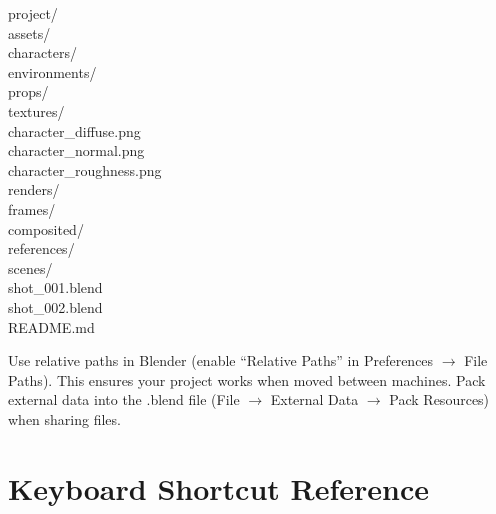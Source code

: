 \documentclass[11pt,letterpaper,twoside,openright]{book}
\begin{document}
\begin{codebox}
project/\\
\hspace{2em}assets/\\
\hspace{4em}characters/\\
\hspace{4em}environments/\\
\hspace{4em}props/\\
\hspace{2em}textures/\\
\hspace{4em}character\_diffuse.png\\
\hspace{4em}character\_normal.png\\
\hspace{4em}character\_roughness.png\\
\hspace{2em}renders/\\
\hspace{4em}frames/\\
\hspace{4em}composited/\\
\hspace{2em}references/\\
\hspace{2em}scenes/\\
\hspace{4em}shot\_001.blend\\
\hspace{4em}shot\_002.blend\\
\hspace{2em}README.md
\end{codebox}

\begin{tipbox}
Use relative paths in Blender (enable ``Relative Paths'' in Preferences $\rightarrow$ File Paths). This ensures your project works when moved between machines. Pack external data into the .blend file (File $\rightarrow$ External Data $\rightarrow$ Pack Resources) when sharing files.
\end{tipbox}



\appendix

\chapter{Keyboard Shortcut Reference}
\label{app:shortcuts}
\end{document}
